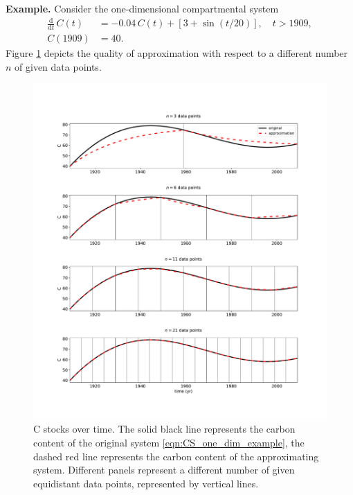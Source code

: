 \documentclass[11pt,a4paper]{article}
\newcommand{\deriv}[1]{\frac{\mathrm{d}}{\mathrm{d}#1}}
\begin{document}
\textbf{Example.}
Consider the one-dimensional compartmental system
\begin{equation}\label{eqn:CS_one_dim_example}
    \begin{aligned}
        \deriv{t}\,C(t) &= -0.04\,C(t) + \left[3+\sin(t/20)\right],\quad t>1909,\\
        C(1909) &= 40.
    \end{aligned}
\end{equation}
Figure \ref{fig:CS_one_dim_example} depicts the quality of approximation with respect to a different number $n$ of given data points.
\begin{figure}[htbp]
    \centering 
    \includegraphics[width=1.0\linewidth]{figs/interpol_pwc_1.pdf}
    \caption{C stocks over time.
        The solid black line represents the carbon content of the original system \eqref{eqn:CS_one_dim_example}, the dashed red line represents the carbon content of the approximating system.
        Different panels represent a different number of given equidistant data points, represented by vertical lines.
        }
    \label{fig:CS_one_dim_example}
\end{figure}        
\end{document}
